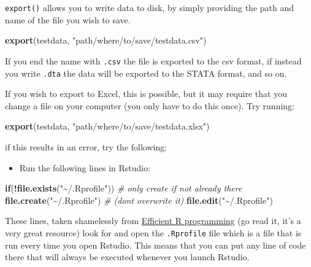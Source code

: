 \documentclass[
]{article}
\newenvironment{Shaded}{\begin{snugshade}}{\end{snugshade}}
\newcommand{\CommentTok}[1]{\textcolor[rgb]{0.56,0.35,0.01}{\textit{#1}}}
\newcommand{\ControlFlowTok}[1]{\textcolor[rgb]{0.13,0.29,0.53}{\textbf{#1}}}
\newcommand{\KeywordTok}[1]{\textcolor[rgb]{0.13,0.29,0.53}{\textbf{#1}}}
\newcommand{\NormalTok}[1]{#1}
\newcommand{\OperatorTok}[1]{\textcolor[rgb]{0.81,0.36,0.00}{\textbf{#1}}}
\newcommand{\StringTok}[1]{\textcolor[rgb]{0.31,0.60,0.02}{#1}}
\providecommand{\tightlist}{%
  \setlength{\itemsep}{0pt}\setlength{\parskip}{0pt}}
\begin{document}
\texttt{export()} allows you to write data to disk, by simply providing the path and name of the file you
wish to save.

\begin{Shaded}
\begin{Highlighting}[]
\KeywordTok{export}\NormalTok{(testdata, }\StringTok{"path/where/to/save/testdata.csv"}\NormalTok{)}
\end{Highlighting}
\end{Shaded}

If you end the name with \texttt{.csv} the file is exported to the csv format, if instead you write \texttt{.dta}
the data will be exported to the STATA format, and so on.

If you wish to export to Excel, this is possible, but it may require that you change a file on your
computer (you only have to do this once). Try running:

\begin{Shaded}
\begin{Highlighting}[]
\KeywordTok{export}\NormalTok{(testdata, }\StringTok{"path/where/to/save/testdata.xlsx"}\NormalTok{)}
\end{Highlighting}
\end{Shaded}

if this results in an error, try the following:

\begin{itemize}
\tightlist
\item
  Run the following lines in Rstudio:
\end{itemize}

\begin{Shaded}
\begin{Highlighting}[]
\ControlFlowTok{if}\NormalTok{(}\OperatorTok{!}\KeywordTok{file.exists}\NormalTok{(}\StringTok{"\textasciitilde{}/.Rprofile"}\NormalTok{)) }\CommentTok{\# only create if not already there}
    \KeywordTok{file.create}\NormalTok{(}\StringTok{"\textasciitilde{}/.Rprofile"}\NormalTok{)    }\CommentTok{\# (don\textquotesingle{}t overwrite it)}
\KeywordTok{file.edit}\NormalTok{(}\StringTok{"\textasciitilde{}/.Rprofile"}\NormalTok{)}
\end{Highlighting}
\end{Shaded}

These lines, taken shamelessly from \href{https://csgillespie.github.io/efficientR/3-3-r-startup.html\#rprofile}{Efficient R
programming} (go read it,
it's a very great resource) look for and open the \texttt{.Rprofile} file which is a file that is run
every time you open Rstudio. This means that you can put any line of code there that will always be
executed whenever you launch Rstudio.
\end{document}

